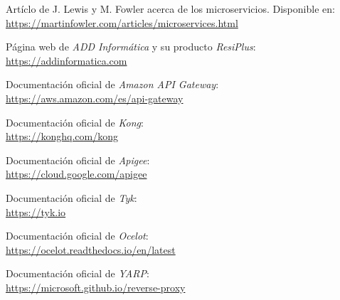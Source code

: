 \documentclass[11pt,spanish,listoffigures]{tfgetsinf}
\begin{document}
\begin{thebibliography}{10}

	Artíclo de J. Lewis y M. Fowler acerca de los microservicios.
	\newblock Disponible en:\\
	\url{https://martinfowler.com/articles/microservices.html}

	Página web de \emph{ADD Informática} y su producto \emph{ResiPlus}:\\
	\url{https://addinformatica.com}

	Documentación oficial de \emph{Amazon API Gateway}:\\
	\url{https://aws.amazon.com/es/api-gateway}
	
	Documentación oficial de \emph{Kong}:\\
	\url{https://konghq.com/kong}
	
	Documentación oficial de \emph{Apigee}:\\
	\url{https://cloud.google.com/apigee}
	
	Documentación oficial de \emph{Tyk}:\\
	\url{https://tyk.io}

	Documentación oficial de \emph{Ocelot}:\\
	\url{https://ocelot.readthedocs.io/en/latest}

	Documentación oficial de \emph{YARP}:\\
	\url{https://microsoft.github.io/reverse-proxy}

\end{thebibliography}
\end{document}
